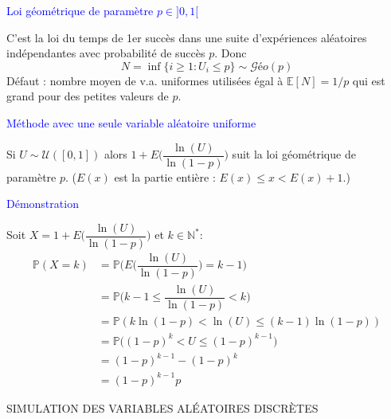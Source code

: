 {\begin{Large}
\hspace{2mm} \colorbox{gray!20}{\textcolor{blue}{Loi géométrique de paramètre $p \in ]0,1[$}}
\end{Large}

\hspace{4mm} C'est la loi du temps de 1er succès dans une suite d'expériences aléatoires indépendantes avec probabilité de succès $p$. Donc
\[ N = \inf \{ i \geq 1: U_{i} \leq p \} \sim \mathcal{G}éo(p) \]
Défaut : nombre moyen de v.a. uniformes utilisées égal à
$\mathbb{E} [N] = 1/p$ qui est grand pour des petites valeurs de $p$.\\

\begin{Large}
\hspace{2mm} \colorbox{gray!20}{\textcolor{blue}{Méthode avec une seule variable aléatoire uniforme}}
\end{Large}

\hspace{4mm} Si $U \sim \mathcal{U} ([0,1])$ alors $1+E \Big( \dfrac{\ln (U)}{\ln (1-p)} \Big)$ suit la loi géométrique de paramètre $p$. ($E(x)$ est la partie entière : $E(x) \leq x < E(x) + 1$.)\\

\begin{Large}
\hspace{2mm} \colorbox{gray!20}{\textcolor{blue}{Démonstration}}
\end{Large}
\hspace{4mm} Soit $X= 1+ E \Big(\dfrac{\ln (U)}{\ln (1-p)} \Big) $ et $k \in \mathbb{N}^{*}$: \\
\begin{align*}
\mathbb{P} (X = k) &= \mathbb{P} \Big( E \Big( \dfrac{\ln (U)}{\ln (1-p)} \Big) = k-1 \Big) \\
&= \mathbb{P} \Big( k-1 \leq \dfrac{\ln (U)}{\ln (1-p)} < k \Big) \\
&= \mathbb{P} (k \ln (1-p) < \ln (U) \leq (k-1) \ln (1-p)) \\
&= \mathbb{P} \big( (1-p)^{k} < U \leq (1-p)^{k-1} \big) \\
&= (1-p)^{k-1} - (1-p)^{k} \\
&= (1-p)^{k-1}p
\end{align*}

\vspace{1cm}

\begin{center}
\begin{Large}
SIMULATION DES VARIABLES ALÉATOIRES DISCRÈTES \\
\end{Large}
\end{center}

}
